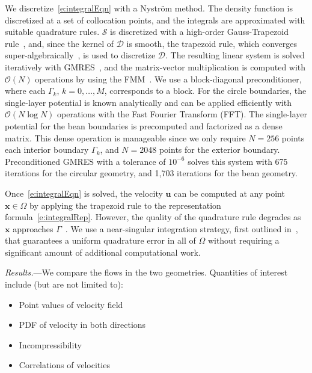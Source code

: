 \documentclass[twocolumn,showpacs,pre,preprintnumbers,floatfix]{revtex4-1}
\newcommand{\uu}{{\mathbf{u}}}
\newcommand{\xx}{{\mathbf{x}}}
\newcommand{\bigO}{{\mathcal{O}}}
\renewcommand{\SS}{{\mathcal{S}}}
\newcommand{\DD}{{\mathcal{D}}}
\begin{document}
We discretize~\eqref{e:integralEqn} with a Nystr\"{o}m method.  The
density function is discretized at a set of collocation points, and the
integrals are approximated with suitable quadrature rules.  $\SS$ is
discretized with a high-order Gauss-Trapezoid rule~\cite{alp1999}, and,
since the kernel of $\DD$ is smooth, the trapezoid rule, which
converges super-algebraically~\cite{tre:wei2014}, is used to discretize
$\DD$.  The resulting linear system is solved iteratively with
GMRES~\cite{saa:sch1986}, and the matrix-vector multiplication is
computed with $\bigO(N)$ operations by using the FMM~\cite{cmcl2012}.
We use a block-diagonal preconditioner, where each $\Gamma_{k}$,
$k=0,\ldots,M$, corresponds to a block.  For the circle boundaries, the
single-layer potential is known analytically and can be applied
efficiently with $\bigO(N \log N)$ operations with the Fast Fourier
Transform (FFT).  The single-layer potential for the bean boundaries is
precomputed and factorized as a dense matrix.  This dense operation is
manageable since we only require $N=256$ points each interior boundary
$\Gamma_{k}$, and $N=2048$ points for the exterior boundary.
Preconditioned GMRES with a tolerance of $10^{-6}$ solves this system
with 675 iterations for the circular geometry, and 1,703 iterations for
the bean geometry.

Once~\eqref{e:integralEqn} is solved, the velocity $\uu$ can be
computed at any point $\xx \in \Omega$ by applying the trapezoid rule
to the representation formula~\eqref{e:integralRep}.  However, the
quality of the quadrature rule degrades as $\xx$ approaches
$\Gamma$~\cite{bar2014,bar:wu:vee2014}.  We use a near-singular
integration strategy, first outlined in~\cite{bir:yin:zor2004}, that
guarantees a uniform quadrature error in all of $\Omega$ without
requiring a significant amount of additional computational work.



{\em Results.}---We compare the flows in the two geometries.
Quantities of interest include (but are not limited to):
\begin{itemize}
  \item Point values of velocity field
  \item PDF of velocity in both directions
  \item Incompressibility
  \item Correlations of velocities
\end{itemize}
\end{document}

